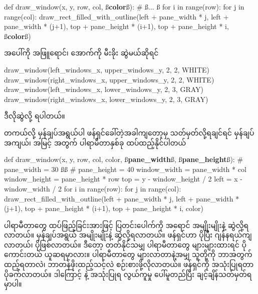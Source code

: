 %
\begin{py}
def draw_window(x, y, row, col, ß\textbf{color}ß):
    # ß$\ldots$ ß
    for i in range(row):
        for j in range(col):
            draw_rect_filled_with_outline(left + pane_width * j,
                                          left + pane_width * (j+1),
                                          top + pane_height * (i+1),
                                          top + pane_height * i,
                                          ß\textbf{color}ß)
\end{py}
%
အပေါ်ကို အဖြူရောင်၊ အောက်ကို မီးခိုး ဆွဲမယ်ဆိုရင်
%
\begin{py}
draw_window(left_windows_x, upper_windows_y, 2, 2, WHITE)
draw_window(right_windows_x, upper_windows_y, 2, 2, WHITE)
draw_window(left_windows_x, lower_windows_y, 2, 3, GRAY)
draw_window(right_windows_x, lower_windows_y, 2, 3, GRAY)
\end{py}
%
ဒီလိုဆွဲလို့ ရပါတယ်။

တကယ်လို့ မှန်ချပ်အရွယ်ပါ ဖန်ရှင်ခေါ်တဲ့အခါကျတော့မှ သတ်မှတ်လို့ရချင်ရင် မှန်ချပ် အကျယ်၊ အမြင့် အတွက် ပါရာမီတာနှစ်ခု ထပ်ထည့်နိုင်ပါတယ်
%
\begin{py}
def draw_window(x, y, row, col, color, ß\textbf{pane\_width}ß, ß\textbf{pane\_height}ß):
    # pane_width = 30  ßß
    # pane_height = 40
    window_width = pane_width * col
    window_height = pane_height * row
    top = y - window_height / 2
    left = x - window_width / 2
    for i in range(row):
        for j in range(col):
            draw_rect_filled_with_outline(left + pane_width * j,
                                          left + pane_width * (j+1),
                                          top + pane_height * (i+1),
                                          top + pane_height * i,
                                          color)
\end{py}
%
ပါရာမီတာတွေ ထပ်ဖြည့်ခြင်းအားဖြင့် ပြတင်းပေါက်ကို အရောင် အမျိုးမျိုးနဲ့ ဆွဲလို့ရလာတယ်။ မှန်ချပ်အရွယ် အမျိုးမျိုးနဲ့ ဆွဲလို့ရလာတယ်။ ဖန်ရှင်ဟာ ပိုပြီး ဂျန်နရယ်ကျလာတယ်၊  ပိုဖြစ်လာတယ်။ ဒီတော့ တတ်နိုင်သမျှ ပါရာမီတာတွေ များများထားရင် ပိုကောင်းတယ် ယူဆရမှာလား။ ပါရာမီတာတွေ များလာတာနဲ့အမျှ သူတို့ကို ဘာအတွက်ထည့်ရတာလဲ၊ ဘာတန်ဖိုးထည့်သင့်လဲ စဉ်းစားဖို့လိုလာတယ်။ ဖန်ရှင်ကို အသုံးပြုရတာ ပိုခက်လာတယ်။ ဒါကြောင့်  နဲ့ အသုံးပြုရ လွယ်ကူမှု ပေါ်မူတည်ပြီး ချင့်ချိန်သတ်မှတ်ရမှာပါ။

